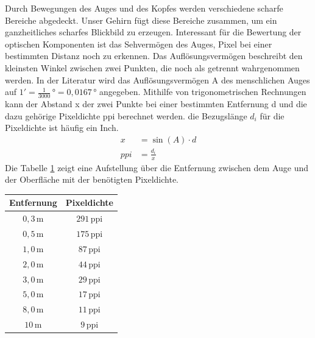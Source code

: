 Durch Bewegungen des Auges und des Kopfes werden verschiedene scharfe Bereiche abgedeckt. Unser Gehirn fügt diese Bereiche zusammen, um ein ganzheitliches scharfes Blickbild zu erzeugen. \cite[Vgl. Seite 14]{Buhler.2017}
Interessant für die Bewertung der optischen Komponenten ist das Sehvermögen des Auges, Pixel bei einer bestimmten Distanz noch zu erkennen. Das Auflösungsvermögen beschreibt den kleinsten Winkel zwischen zwei Punkten, die noch als getrennt wahrgenommen werden. In der Literatur wird das Auflösungsvermögen A des menschlichen Auges auf $ 1' = \frac{1}{3000}\,\mathrm{°} = 0,0167\,\mathrm{°} $ angegeben. Mithilfe von trigonometrischen Rechnungen kann der Abstand x der zwei Punkte bei einer bestimmten Entfernung d und die dazu gehörige Pixeldichte ppi berechnet werden. die Bezugslänge $ d_{i} $ für die Pixeldichte ist häufig ein Inch. \cite[Vgl. Seite 209 f.]{LofflerMang.2020}
\begin{align}
	x &= \sin (A) \cdot d \\
	ppi &= \frac{d_{i}}{x}
\end{align}
Die Tabelle \ref{tab:Aufloessung} zeigt eine Aufstellung über die Entfernung zwischen dem Auge und der Oberfläche mit der benötigten Pixeldichte.
\begin{table}[hbt]	
	\centering
	\renewcommand{\arraystretch}{1.5}	%
	\label{tab:Aufloessung}
	\begin{tabular}{c|c}
		\parbox[t]{0.2\linewidth}{\centering Entfernung} & \parbox[t]{0.2\linewidth}{\centering Pixeldichte}  \\
		\hline 
		\hline 
		$ 0,3\,\mathrm{m} $ & $ 291\,\mathrm{ppi} $ \\
		$ 0,5\,\mathrm{m} $ & $ 175\,\mathrm{ppi} $ \\
		$ 1,0\,\mathrm{m} $ & $ 87\,\mathrm{ppi} $ \\
		$ 2,0\,\mathrm{m} $ & $ 44\,\mathrm{ppi} $ \\
		$ 3,0\,\mathrm{m} $ & $ 29\,\mathrm{ppi} $ \\
		$ 5,0\,\mathrm{m} $ & $ 17\,\mathrm{ppi} $ \\
		$ 8,0\,\mathrm{m} $ & $ 11\,\mathrm{ppi} $ \\
		$ 10\,\mathrm{m} $ & $ 9\,\mathrm{ppi} $ \\
	\end{tabular} 
\end{table}
